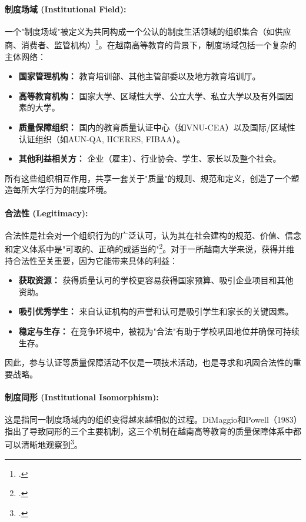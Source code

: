 \paragraph{制度场域 (Institutional Field):}
一个"制度场域"被定义为共同构成一个公认的制度生活领域的组织集合（如供应商、消费者、监管机构）\footcite{DiMaggioPowell1983}。在越南高等教育的背景下，制度场域包括一个复杂的主体网络：
\begin{itemize}
    \item \textbf{国家管理机构：} 教育培训部、其他主管部委以及地方教育培训厅。
    \item \textbf{高等教育机构：} 国家大学、区域性大学、公立大学、私立大学以及有外国因素的大学。
    \item \textbf{质量保障组织：} 国内的教育质量认证中心（如VNU-CEA）以及国际/区域性认证组织（如AUN-QA, HCERES, FIBAA）。
    \item \textbf{其他利益相关方：} 企业（雇主）、行业协会、学生、家长以及整个社会。
\end{itemize}
所有这些组织相互作用，共享一套关于"质量"的规则、规范和定义，创造了一个塑造每所大学行为的制度环境。

\paragraph{合法性 (Legitimacy):}
合法性是社会对一个组织行为的广泛认可，认为其在社会建构的规范、价值、信念和定义体系中是"可取的、正确的或适当的"\footcite{Suchman1995}。对于一所越南大学来说，获得并维持合法性至关重要，因为它能带来具体的利益：
\begin{itemize}
    \item \textbf{获取资源：} 获得质量认可的学校更容易获得国家预算、吸引企业项目和其他资助。
    \item \textbf{吸引优秀学生：} 来自认证机构的声誉和认可是吸引学生和家长的关键因素。
    \item \textbf{稳定与生存：} 在竞争环境中，被视为"合法"有助于学校巩固地位并确保可持续生存。
\end{itemize}
因此，参与认证等质量保障活动不仅是一项技术活动，也是寻求和巩固合法性的重要战略。

\paragraph{制度同形 (Institutional Isomorphism):}
这是指同一制度场域内的组织变得越来越相似的过程。DiMaggio和Powell（1983）指出了导致同形的三个主要机制，这三个机制在越南高等教育的质量保障体系中都可以清晰地观察到\footcite{DiMaggioPowell1983}。


